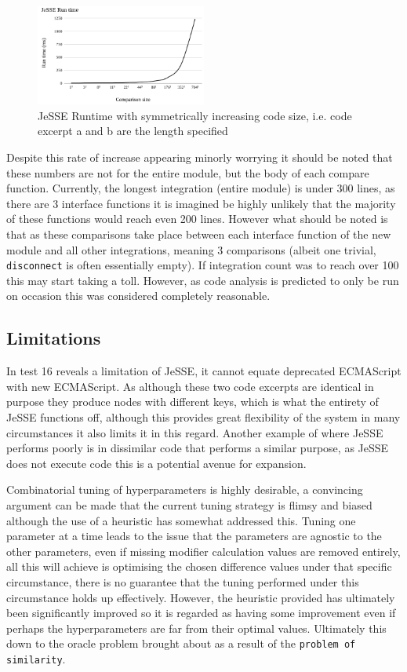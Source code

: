 \documentclass[jou,apacite]{apa6}
\begin{document}
\begin{figure}[h]
\caption{JeSSE Runtime with symmetrically increasing code size, i.e. code excerpt a and b are the length specified}
\centering
\includegraphics[width=0.5\textwidth]{jesseefficiency}
\end{figure}

Despite this rate of increase appearing minorly worrying it should be noted that these numbers are not for the entire module, but the body of each compare function. Currently, the longest integration (entire module) is under 300 lines, as there are 3 interface functions it is imagined be highly unlikely that the majority of these functions would reach even 200 lines. However what should be noted is that as these comparisons take place between each interface function of the new module and all other integrations, meaning 3 comparisons (albeit one trivial, \texttt{disconnect} is often essentially empty). If integration count was to reach over 100 this may start taking a toll. However, as code analysis is predicted to only be run on occasion this was considered completely reasonable.

\subsection{Limitations}
 In test 16 reveals a limitation of JeSSE, it cannot equate deprecated ECMAScript with new ECMAScript. As although these two code excerpts are identical in purpose they produce nodes with different keys, which is what the entirety of JeSSE functions off, although this provides great flexibility of the system in many circumstances it also limits it in this regard. Another example of where JeSSE performs poorly is in dissimilar code that performs a similar purpose, as JeSSE does not execute code this is a potential avenue for expansion.
 
 Combinatorial tuning of hyperparameters is highly desirable, a convincing argument can be made that the current tuning strategy is flimsy and biased although the use of a heuristic has somewhat addressed this. Tuning one parameter at a time leads to the issue that the parameters are agnostic to the other parameters, even if missing modifier calculation values are removed entirely, all this will achieve is optimising the chosen difference values under that specific circumstance, there is no guarantee that the tuning performed under this circumstance holds up effectively. However, the heuristic provided has ultimately been significantly improved so it is regarded as having some improvement even if perhaps the hyperparameters are far from their optimal values.  Ultimately this down to the oracle problem brought about as a result of the \texttt{problem of similarity}.
 
\end{document}
